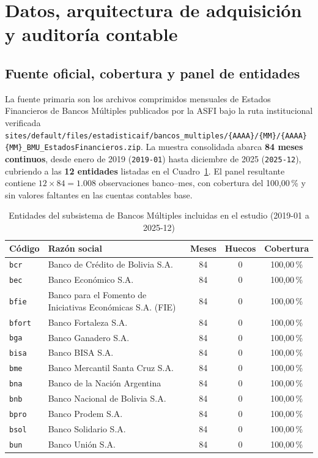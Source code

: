 \documentclass[11pt,letterpaper]{article}
\begin{document}
\section{Datos, arquitectura de adquisición y auditoría contable}

\subsection{Fuente oficial, cobertura y panel de entidades}

La fuente primaria son los archivos comprimidos mensuales de Estados Financieros de Bancos Múltiples publicados por la ASFI bajo la ruta institucional verificada \texttt{sites/default/files/estadisticaif/bancos\_multiples/\{AAAA\}/\{MM\}/\{AAAA\}\{MM\}\_BMU\_EstadosFinancieros.zip}. La muestra consolidada abarca \textbf{84 meses continuos}, desde enero de 2019 (\texttt{2019-01}) hasta diciembre de 2025 (\texttt{2025-12}), cubriendo a las \textbf{12 entidades} listadas en el Cuadro~\ref{tab:entidades}. El panel resultante contiene \(12 \times 84 = \mathbf{1.008}\) observaciones banco--mes, con cobertura del 100{,}00\,\% y sin valores faltantes en las cuentas contables base.

\begin{table}[H]
\centering
\caption{Entidades del subsistema de Bancos Múltiples incluidas en el estudio (2019-01 a 2025-12)}
\label{tab:entidades}
\small
\begin{tabular}{llccc}
\toprule
Código & Razón social & Meses & Huecos & Cobertura \\
\midrule
\texttt{bcr} & Banco de Crédito de Bolivia S.A. & 84 & 0 & 100{,}00\,\% \\
\texttt{bec} & Banco Económico S.A. & 84 & 0 & 100{,}00\,\% \\
\texttt{bfie} & Banco para el Fomento de Iniciativas Económicas S.A. (FIE) & 84 & 0 & 100{,}00\,\% \\
\texttt{bfort} & Banco Fortaleza S.A. & 84 & 0 & 100{,}00\,\% \\
\texttt{bga} & Banco Ganadero S.A. & 84 & 0 & 100{,}00\,\% \\
\texttt{bisa} & Banco BISA S.A. & 84 & 0 & 100{,}00\,\% \\
\texttt{bme} & Banco Mercantil Santa Cruz S.A. & 84 & 0 & 100{,}00\,\% \\
\texttt{bna} & Banco de la Nación Argentina & 84 & 0 & 100{,}00\,\% \\
\texttt{bnb} & Banco Nacional de Bolivia S.A. & 84 & 0 & 100{,}00\,\% \\
\texttt{bpro} & Banco Prodem S.A. & 84 & 0 & 100{,}00\,\% \\
\texttt{bsol} & Banco Solidario S.A. & 84 & 0 & 100{,}00\,\% \\
\texttt{bun} & Banco Unión S.A. & 84 & 0 & 100{,}00\,\% \\
\bottomrule
\end{tabular}
\end{table}
\end{document}
